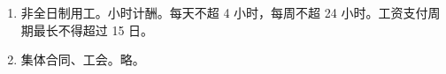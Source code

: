 \begin{enumerate}
        \begin{enumerate}
          \item 临时性  月 \hz 辅助性 \yjt 非主营业务/核心/管理岗位 \hz 替代性 \yjt 正式工脱产了。
          \item 劳务派遣单位。行政许可前置、1 次签 2 年、不得分割用工期限、禁止自设自派。
          \item 过错、不适岗，用工单位才能退。
        \end{enumerate}
  \item 非全日制用工。小时计酬。每天不超 4 小时，每周不超 24 小时。工资支付周期最长不得超过 15 日。
  \item 集体合同、工会。略。
\end{enumerate}
